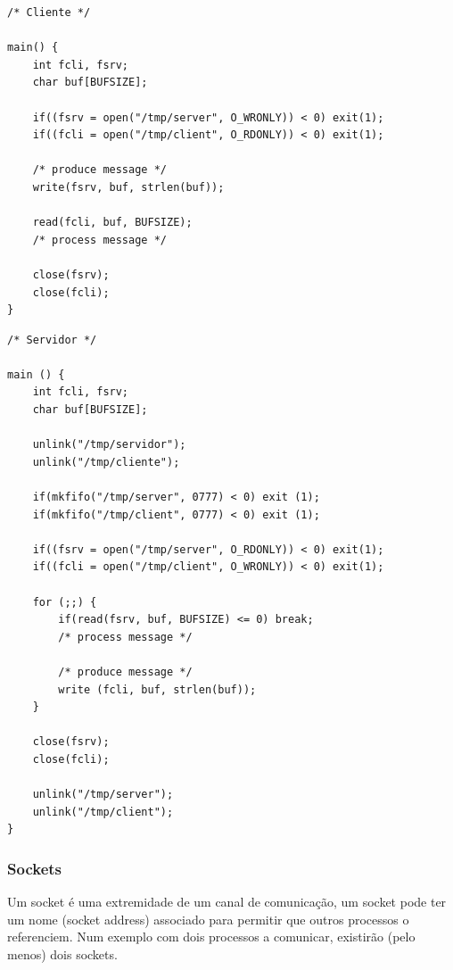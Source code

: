 \documentclass[11pt]{article}
\begin{document}
\begin{minipage}[t]{0.5\textwidth}
    \begin{lstlisting}
/* Cliente */

main() {
    int fcli, fsrv;
    char buf[BUFSIZE];

    if((fsrv = open("/tmp/server", O_WRONLY)) < 0) exit(1);
    if((fcli = open("/tmp/client", O_RDONLY)) < 0) exit(1);

    /* produce message */
    write(fsrv, buf, strlen(buf));

    read(fcli, buf, BUFSIZE);
    /* process message */

    close(fsrv);
    close(fcli);
}
    \end{lstlisting}
\end{minipage}
\begin{minipage}[t]{0.5\textwidth}
    \begin{lstlisting}
/* Servidor */

main () {
    int fcli, fsrv;
    char buf[BUFSIZE];

    unlink("/tmp/servidor");
    unlink("/tmp/cliente");

    if(mkfifo("/tmp/server", 0777) < 0) exit (1);
    if(mkfifo("/tmp/client", 0777) < 0) exit (1);

    if((fsrv = open("/tmp/server", O_RDONLY)) < 0) exit(1);
    if((fcli = open("/tmp/client", O_WRONLY)) < 0) exit(1);

    for (;;) {
        if(read(fsrv, buf, BUFSIZE) <= 0) break;
        /* process message */
        
        /* produce message */
        write (fcli, buf, strlen(buf));
    }

    close(fsrv);
    close(fcli);

    unlink("/tmp/server");
    unlink("/tmp/client");
}
    \end{lstlisting}
\end{minipage}

\subsubsection{Sockets}

Um socket é uma extremidade de um canal de comunicação, um socket pode ter um nome (socket address) associado para permitir que outros processos o referenciem. Num exemplo com dois processos a comunicar, existirão (pelo menos) dois sockets.
\end{document}
